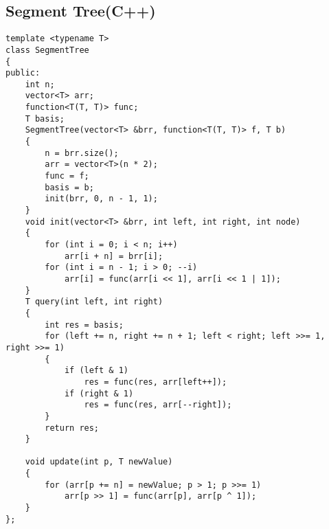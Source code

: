 \documentclass[landscape, 8pt, a4paper, oneside, twocolumn]{extarticle}
\begin{document}
\subsection{Segment Tree(C++)}
\begin{verbatim}
template <typename T>
class SegmentTree
{
public:
    int n;
    vector<T> arr;
    function<T(T, T)> func;
    T basis;
    SegmentTree(vector<T> &brr, function<T(T, T)> f, T b)
    {
        n = brr.size();
        arr = vector<T>(n * 2);
        func = f;
        basis = b;
        init(brr, 0, n - 1, 1);
    }
    void init(vector<T> &brr, int left, int right, int node)
    {
        for (int i = 0; i < n; i++)
            arr[i + n] = brr[i];
        for (int i = n - 1; i > 0; --i)
            arr[i] = func(arr[i << 1], arr[i << 1 | 1]);
    }
    T query(int left, int right)
    {
        int res = basis;
        for (left += n, right += n + 1; left < right; left >>= 1, right >>= 1)
        {
            if (left & 1)
                res = func(res, arr[left++]);
            if (right & 1)
                res = func(res, arr[--right]);
        }
        return res;
    }

    void update(int p, T newValue)
    {
        for (arr[p += n] = newValue; p > 1; p >>= 1)
            arr[p >> 1] = func(arr[p], arr[p ^ 1]);
    }
};

\end{verbatim}
\end{document}
